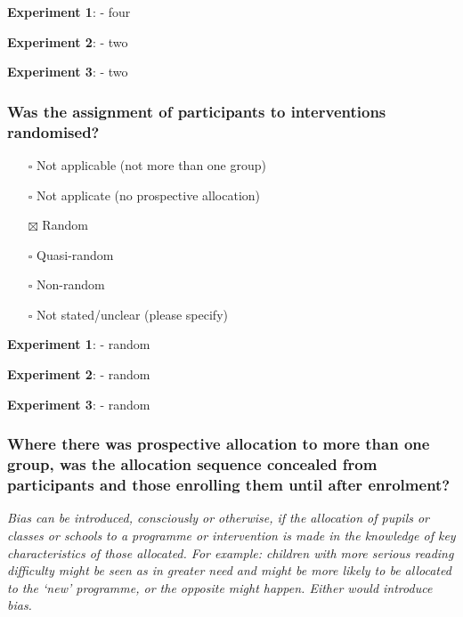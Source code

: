\documentclass[
  doc, a4paper]{apa7}
\providecommand{\tightlist}{%
  \setlength{\itemsep}{0pt}\setlength{\parskip}{0pt}}
\begin{document}
\textbf{Experiment 1}:
- four

\textbf{Experiment 2}:
- two

\textbf{Experiment 3}:
- two

\subsubsection{Was the assignment of participants to interventions randomised?}\label{was-the-assignment-of-participants-to-interventions-randomised}

\begin{itemize}
\tightlist
\item[$\square$]
  Not applicable (not more than one group)\\
\item[$\square$]
  Not applicate (no prospective allocation)\\
\item[$\boxtimes$]
  Random\\
\item[$\square$]
  Quasi-random\\
\item[$\square$]
  Non-random\\
\item[$\square$]
  Not stated/unclear (please specify)
\end{itemize}

\textbf{Experiment 1}:
- random

\textbf{Experiment 2}:
- random

\textbf{Experiment 3}:
- random

\subsubsection{Where there was prospective allocation to more than one group, was the allocation sequence concealed from participants and those enrolling them until after enrolment?}\label{where-there-was-prospective-allocation-to-more-than-one-group-was-the-allocation-sequence-concealed-from-participants-and-those-enrolling-them-until-after-enrolment}

\emph{Bias can be introduced, consciously or otherwise, if the allocation of pupils or classes or schools to a programme or intervention is made in the knowledge of key characteristics of those allocated. For example: children with more serious reading difficulty might be seen as in greater need and might be more likely to be allocated to the `new' programme, or the opposite might happen. Either would introduce bias.}
\end{document}
